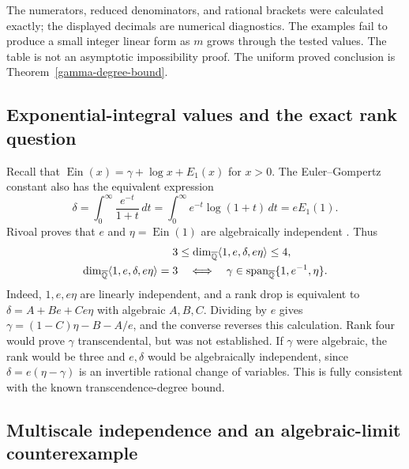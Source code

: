 \documentclass[11pt,a4paper]{article}
\theoremstyle{definition}
\theoremstyle{remark}
\numberwithin{equation}{section}
\begin{document}
The numerators, reduced denominators, and rational brackets were
calculated exactly; the displayed decimals are numerical diagnostics.
The examples fail to produce a small integer linear form as $m$ grows
through the tested values. The table is not an asymptotic impossibility
proof. The uniform proved conclusion is
Theorem~\ref{gamma-degree-bound}.

\subsection{Exponential-integral values and the exact rank question}
\label{gamma-rank}

Recall that $\operatorname{Ein}(x)=\gamma+\log x+E_1(x)$ for $x>0$.
The Euler--Gompertz constant also has the equivalent expression
\[
 \delta=\int_0^\infty\frac{e^{-t}}{1+t}\,dt
 =\int_0^\infty e^{-t}\log(1+t)\,dt=eE_1(1).
\]
Rivoal proves that $e$ and $\eta=\operatorname{Ein}(1)$ are
algebraically independent \cite[\S5]{gamma-Rivoal}. Thus
\begin{align}
 3&\le\dim_{\overline{\mathbb Q}}
       \langle1,e,\delta,e\eta\rangle\le4,\notag\\
 \dim_{\overline{\mathbb Q}}\langle1,e,\delta,e\eta\rangle=3
 &\quad\Longleftrightarrow\quad
 \gamma\in\operatorname{span}_{\overline{\mathbb Q}}
 \{1,e^{-1},\eta\}.
 \label{gamma-rank-equivalence}
\end{align}
Indeed, $1,e,e\eta$ are linearly independent, and a rank drop is
equivalent to $\delta=A+Be+Ce\eta$ with algebraic $A,B,C$. Dividing
by $e$ gives $\gamma=(1-C)\eta-B-A/e$, and the converse reverses
this calculation. Rank four would prove $\gamma$ transcendental, but
was not established. If $\gamma$ were algebraic, the rank would be
three and $e,\delta$ would be algebraically independent, since
$\delta=e(\eta-\gamma)$ is an invertible rational change of variables.
This is fully consistent with the known transcendence-degree bound.

\subsection{Multiscale independence and an algebraic-limit counterexample}
\label{gamma-multiscale}
\end{document}
